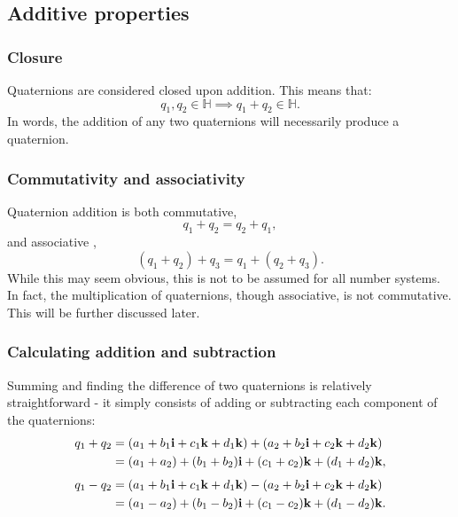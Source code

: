 \documentclass[12pt]{article}
\theoremstyle{definition}
\begin{document}
\subsection{Additive properties}

\subsubsection{Closure}

Quaternions are considered closed upon addition. This means that:
\begin{equation}
    q_1, q_2 \in \mathbb{H} \implies q_1 + q_2 \in \mathbb{H}.
\end{equation}
In words, the addition of any two quaternions will necessarily produce a quaternion. \cite{Illinois}

\subsubsection{Commutativity and associativity}

Quaternion addition is both commutative,
\begin{equation}
    q_1 + q_2 = q_2 + q_1,
\end{equation}
and associative \cite{Illinois},
\begin{equation}
    (q_1 + q_2) + q_3 = q_1 + (q_2 + q_3).
\end{equation}
While this may seem obvious, this is not to be assumed for all number systems. In fact, the multiplication of quaternions, though associative, is not commutative. This will be further discussed later.

\subsubsection{Calculating addition and subtraction}

Summing and finding the difference of two quaternions is relatively straightforward - it simply consists of adding or subtracting each component of the quaternions: \cite{Illinois}
\begin{equation}
    \begin{aligned}
        q_1 + q_2 & = (a_1 + b_1\vb{i} + c_1\vb{k} + d_1\vb{k}) + (a_2 + b_2\vb{i} + c_2\vb{k} + d_2\vb{k}) \\
                  & = (a_1+a_2) + (b_1+b_2)\vb{i} + (c_1+c_2)\vb{k} + (d_1+d_2)\vb{k},
    \end{aligned}
\end{equation}
\begin{equation}
    \begin{aligned}
        q_1 - q_2 & = (a_1 + b_1\vb{i} + c_1\vb{k} + d_1\vb{k}) - (a_2 + b_2\vb{i} + c_2\vb{k} + d_2\vb{k}) \\
                  & = (a_1-a_2) + (b_1-b_2)\vb{i} + (c_1-c_2)\vb{k} + (d_1-d_2)\vb{k}.
    \end{aligned}
\end{equation}
\end{document}

